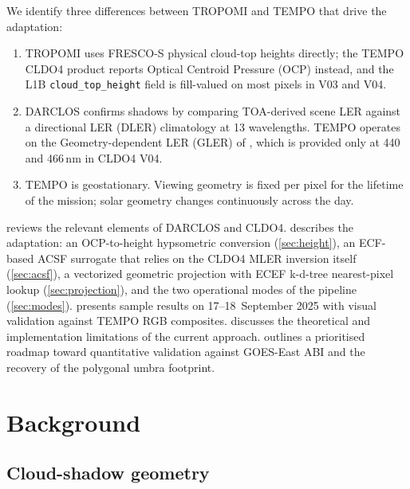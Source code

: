 \documentclass[11pt,a4paper]{article}
\newcommand{\code}[1]{\texttt{#1}}
\begin{document}
We identify three differences between TROPOMI and TEMPO that drive the
adaptation:

\begin{enumerate}
  \item TROPOMI uses FRESCO-S physical cloud-top heights directly; the
        TEMPO CLDO4 product reports Optical Centroid Pressure (OCP)
        instead, and the L1B \code{cloud\_top\_height} field is
        fill-valued on most pixels in V03 and V04.
  \item DARCLOS confirms shadows by comparing TOA-derived scene LER
        against a directional LER (DLER) climatology at 13 wavelengths.
        TEMPO operates on the Geometry-dependent LER (GLER) of
        \citet{vasilkov2017gler}, which is provided only at 440 and
        466\,nm in CLDO4 V04.
  \item TEMPO is geostationary. Viewing geometry is fixed per pixel for
        the lifetime of the mission; solar geometry changes continuously
        across the day.
\end{enumerate}

 reviews the relevant elements of DARCLOS and CLDO4.
 describes the adaptation: an OCP-to-height
hypsometric conversion (\cref{sec:height}), an ECF-based ACSF surrogate
that relies on the CLDO4 MLER inversion itself (\cref{sec:acsf}), a
vectorized geometric projection with ECEF k-d-tree nearest-pixel lookup
(\cref{sec:projection}), and the two operational modes of the pipeline
(\cref{sec:modes}).  presents sample results on
17--18~September 2025 with visual validation against TEMPO RGB
composites.  discusses the theoretical and
implementation limitations of the current approach.
 outlines a prioritised roadmap toward quantitative
validation against GOES-East ABI and the recovery of the polygonal umbra
footprint.

\section{Background}\label{sec:background}

\subsection{Cloud-shadow geometry}\label{sec:geometry}
\end{document}
